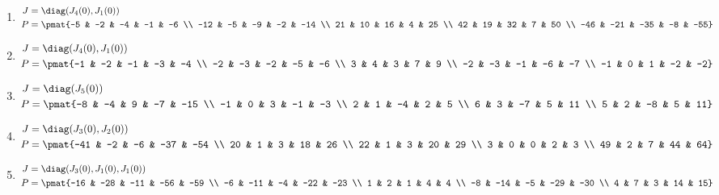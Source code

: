 \begin{enumerate}
\item

\begin{align*}
J &= \diag(J_{4}(0), J_{1}(0))\\
P &= \pmat{-5 & -2 & -4 & -1 & -6 \\ -12 & -5 & -9 & -2 & -14 \\ 21 & 10 & 16 & 4 & 25 \\ 42 & 19 & 32 & 7 & 50 \\ -46 & -21 & -35 & -8 & -55}
\end{align*}

\item

\begin{align*}
J &= \diag(J_{4}(0), J_{1}(0))\\
P &= \pmat{-1 & -2 & -1 & -3 & -4 \\ -2 & -3 & -2 & -5 & -6 \\ 3 & 4 & 3 & 7 & 9 \\ -2 & -3 & -1 & -6 & -7 \\ -1 & 0 & 1 & -2 & -2}
\end{align*}

\item

\begin{align*}
J &= \diag(J_{5}(0))\\
P &= \pmat{-8 & -4 & 9 & -7 & -15 \\ -1 & 0 & 3 & -1 & -3 \\ 2 & 1 & -4 & 2 & 5 \\ 6 & 3 & -7 & 5 & 11 \\ 5 & 2 & -8 & 5 & 11}
\end{align*}

\item

\begin{align*}
J &= \diag(J_{3}(0), J_{2}(0))\\
P &= \pmat{-41 & -2 & -6 & -37 & -54 \\ 20 & 1 & 3 & 18 & 26 \\ 22 & 1 & 3 & 20 & 29 \\ 3 & 0 & 0 & 2 & 3 \\ 49 & 2 & 7 & 44 & 64}
\end{align*}

\item

\begin{align*}
J &= \diag(J_{3}(0), J_{1}(0), J_{1}(0))\\
P &= \pmat{-16 & -28 & -11 & -56 & -59 \\ -6 & -11 & -4 & -22 & -23 \\ 1 & 2 & 1 & 4 & 4 \\ -8 & -14 & -5 & -29 & -30 \\ 4 & 7 & 3 & 14 & 15}
\end{align*}


\end{enumerate}
